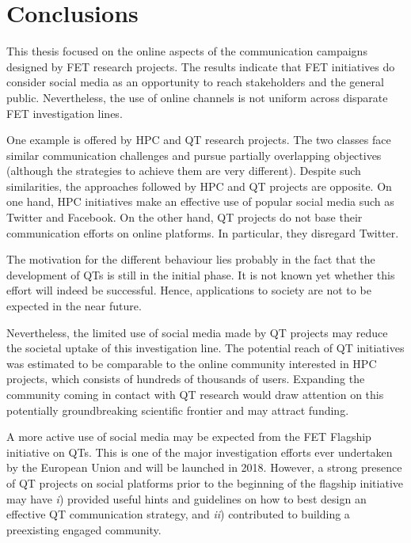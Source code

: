 \chapter*{Conclusions}
This thesis focused on the online aspects of the communication campaigns designed by FET research projects. The results indicate that FET initiatives do consider social media as an opportunity to reach stakeholders and the general public. Nevertheless, the use of online channels is not uniform across disparate FET investigation lines.  

One example is offered by HPC and QT research projects. The two classes face similar communication challenges and pursue partially overlapping objectives (although the strategies to achieve them are very different). Despite such similarities, the approaches followed by HPC and QT projects are opposite. On one hand, HPC initiatives make an effective use of popular social media such as Twitter and Facebook. On the other hand, QT projects do not base their communication efforts on online platforms. In particular, they disregard Twitter.  

The motivation for the different behaviour lies probably in the fact that the development of QTs is still in the initial phase. It is not known yet whether this effort will indeed be successful. Hence, applications to society are not to be expected in the near future. 

Nevertheless, the limited use of social media made by QT projects may reduce the societal uptake of this investigation line. The potential reach of QT initiatives was estimated to be comparable to the online community interested in HPC projects, which consists of hundreds of thousands of users. Expanding the community coming in contact with QT research would draw attention on this potentially groundbreaking scientific frontier and may attract funding.

A more active use of social media may be expected from the FET Flagship initiative on QTs. This is one of the major investigation efforts ever undertaken by the European Union and will be launched in 2018. However, a strong presence of QT projects on social platforms prior to the beginning of the flagship initiative may have \textit{i}) provided useful hints and guidelines on how to best design an effective QT communication strategy, and \textit{ii}) contributed to building a preexisting engaged community.